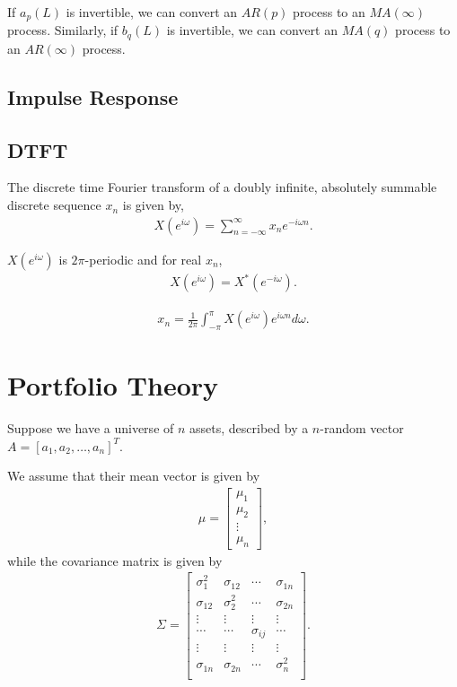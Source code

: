 \documentclass{amsart}
\theoremstyle{plain}
\numberwithin{equation}{section}
\begin{document}
If $a_p(L)$ is invertible, we can convert an $AR(p)$ process
to an $MA(\infty)$ process. Similarly, if $b_q(L)$ is 
invertible, we can convert an $MA(q)$ process to an 
$AR(\infty)$ process. 


\subsection{Impulse Response}
 
\subsection{DTFT}
The discrete time Fourier transform of 
a doubly infinite, absolutely summable discrete sequence $x_n$
is given by,
\begin{align*}
X(e^{i\omega}) = \sum_{n=-\infty}^{\infty} x_n e^{-i \omega n}.
\end{align*}

$X(e^{i\omega})$ is $2\pi$-periodic and for real $x_n$,
\begin{align*}
X(e^{i\omega}) = X^*(e^{-i\omega}).
\end{align*}

\begin{align*}
x_n = \frac{1}{2\pi}
\int_{-\pi}^{\pi} X(e^{i\omega})e^{i\omega n} d \omega.
\end{align*}

\section{Portfolio Theory}
Suppose we have a universe of 
$n$ assets, described by a $n$-random vector 
$A =[a_1, a_2, \ldots, a_n]^T$.

We assume that their mean vector is given by 
\begin{align*}
\mu = 
\begin{bmatrix}
\mu_1\\
\mu_2\\
\vdots\\
\mu_n
\end{bmatrix},
\end{align*}
while the covariance matrix is given by
\begin{align*}
\Sigma = \begin{bmatrix}
\sigma_1^2  & \sigma_{12} & \cdots & \sigma_{1n}\\
\sigma_{12} & \sigma_2^2  & \cdots & \sigma_{2n}\\
\vdots      & \vdots      & \vdots & \vdots \\
\cdots      & \cdots      & \sigma_{ij} & \cdots \\
\vdots      & \vdots      & \vdots & \vdots \\
\sigma_{1n} & \sigma_{2n} & \cdots & \sigma_n^2\\
\end{bmatrix}.
\end{align*}
\end{document}
